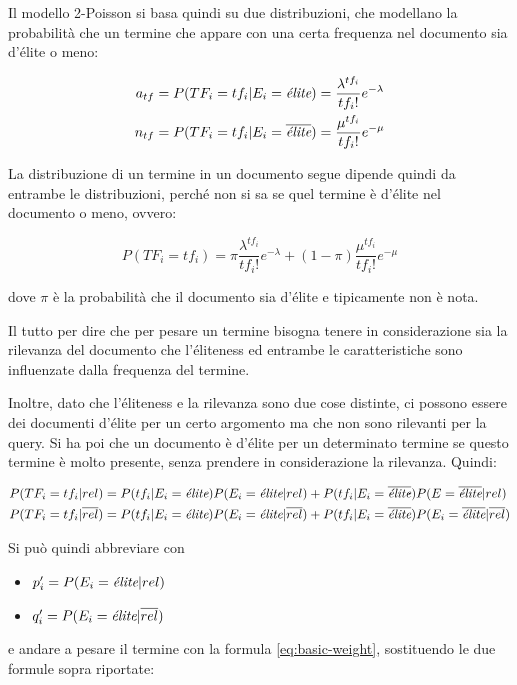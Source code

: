 Il modello 2-Poisson si basa quindi su due distribuzioni, che modellano la probabilità che un termine che appare con una certa frequenza nel documento sia d'élite o meno:

\begin{align}
a_{tf} &= P(TF_i = tf_i | E_i = \elite) = \frac{\lambda^{tf_i}}{{tf_i}!}e^{-\lambda}\\
n_{tf} &= P(TF_i = tf_i | E_i = \notelite) = \frac{\mu^{tf_i}}{{tf_i}!}e^{-\mu}
\end{align}

La distribuzione di un termine in un documento segue dipende quindi da entrambe le distribuzioni, perché non si sa se quel termine è d'élite nel documento o meno, ovvero:

$$
P(TF_i = tf_i) = \pi \frac{\lambda^{tf_i}}{{tf_i}!}e^{-{\lambda}} + (1 - \pi) \frac{\mu^{tf_i}}{{tf_i}!}e^{-\mu}
$$

\noindent dove $\pi$ è la probabilità che il documento sia d'élite e tipicamente non è nota.

Il tutto per dire che per pesare un termine bisogna tenere in considerazione sia la rilevanza del documento che l'éliteness ed entrambe le caratteristiche sono influenzate dalla frequenza del termine. 

Inoltre, dato che l'éliteness e la rilevanza sono due cose distinte, ci possono essere dei documenti d'élite per un certo argomento ma che non sono rilevanti per la query.
Si ha poi che un documento è d'élite per un determinato termine se questo termine è molto presente, senza prendere in considerazione la rilevanza.
Quindi:

\begin{align}
P(TF_i = tf_i | \rel) &= P(tf_i | E_i = \elite)P(E_i = \elite | \rel) + P(tf_i |E_i = \notelite)P(E = \notelite | \rel) \\
P(TF_i = tf_i | \notrel) &= P(tf_i | E_i = \elite)P(E_i = \elite | \notrel) + P(tf_i |E_i = \notelite)P(E_i = \notelite | \notrel) 
\end{align}

Si può quindi abbreviare con

\begin{itemize}
	\item $p_i' = P(E_i = \elite | \rel)$
	\item $q_i' = P(E_i = \elite | \notrel)$
\end{itemize}

e andare a pesare il termine con la formula \ref{eq:basic-weight}, sostituendo le due formule sopra riportate:

